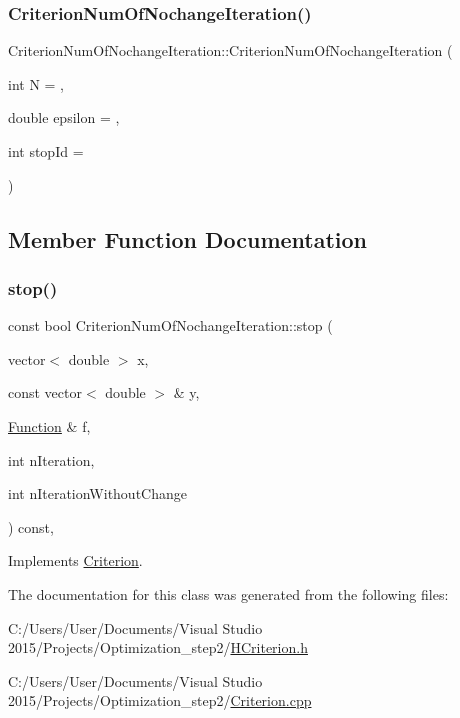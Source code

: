 \subsubsection{\texorpdfstring{Criterion\+Num\+Of\+Nochange\+Iteration()}{CriterionNumOfNochangeIteration()}}
{\footnotesize\ttfamily Criterion\+Num\+Of\+Nochange\+Iteration\+::\+Criterion\+Num\+Of\+Nochange\+Iteration (\begin{DoxyParamCaption}\item[{int}]{N = {},  }\item[{double}]{epsilon = {},  }\item[{int}]{stop\+Id = {} }\end{DoxyParamCaption})\hspace{0.3cm}{\ttfamily [inline]}}



\subsection{Member Function Documentation}
\mbox{\label{class_criterion_num_of_nochange_iteration_a4d46c7bfa8d1e31171d11c77a96e91ed}} 
\subsubsection{\texorpdfstring{stop()}{stop()}}
{\footnotesize\ttfamily const bool Criterion\+Num\+Of\+Nochange\+Iteration\+::stop (\begin{DoxyParamCaption}\item[{vector$<$ double $>$}]{x,  }\item[{const vector$<$ double $>$ \&}]{y,  }\item[{\hyperlink{class_function}{Function} \&}]{f,  }\item[{int}]{n\+Iteration,  }\item[{int}]{n\+Iteration\+Without\+Change }\end{DoxyParamCaption}) const\hspace{0.3cm}{\ttfamily [override]}, {\ttfamily [virtual]}}



Implements \hyperlink{class_criterion_aee3e2148c665c72c50c2f870a3ca8cdc}{Criterion}.



The documentation for this class was generated from the following files\+:\begin{DoxyCompactItemize}
\item 
C\+:/\+Users/\+User/\+Documents/\+Visual Studio 2015/\+Projects/\+Optimization\+\_\+step2/\hyperlink{_h_criterion_8h}{H\+Criterion.\+h}\item 
C\+:/\+Users/\+User/\+Documents/\+Visual Studio 2015/\+Projects/\+Optimization\+\_\+step2/\hyperlink{_criterion_8cpp}{Criterion.\+cpp}\end{DoxyCompactItemize}
